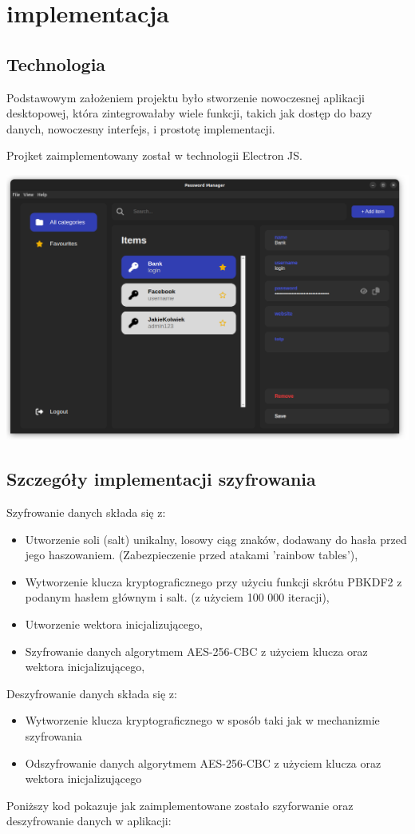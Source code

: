 \section{implementacja}

\subsection{Technologia}
Podstawowym założeniem projektu było stworzenie nowoczesnej aplikacji desktopowej,
która zintegrowałaby wiele funkcji, takich jak dostęp do bazy danych, nowoczesny interfejs,
i prostotę implementacji. 

Projket zaimplementowany został w technologii Electron JS.

\includegraphics[width=1\linewidth]{interfejs}
\subsection{Szczegóły implementacji szyfrowania}
Szyfrowanie danych składa się z:
\begin{itemize}
    \item Utworzenie soli (salt) unikalny, losowy ciąg znaków, dodawany do hasła przed jego haszowaniem. (Zabezpieczenie przed atakami 'rainbow tables'),
    \item Wytworzenie  klucza kryptograficznego przy użyciu funkcji skrótu PBKDF2 z podanym hasłem głównym  i salt. (z użyciem 100 000 iteracji),
    \item Utworzenie wektora inicjalizującego,
    \item Szyfrowanie  danych  algorytmem AES-256-CBC z użyciem klucza oraz wektora inicjalizującego,
\end{itemize}
Deszyfrowanie danych składa się z:
\begin{itemize}
    \item Wytworzenie  klucza kryptograficznego w sposób taki jak w mechanizmie szyfrowania
    \item Odszyfrowanie  danych  algorytmem AES-256-CBC z użyciem klucza oraz wektora inicjalizującego
\end{itemize}
Poniższy kod pokazuje jak zaimplementowane zostało szyforwanie oraz deszyfrowanie danych w aplikacji:

